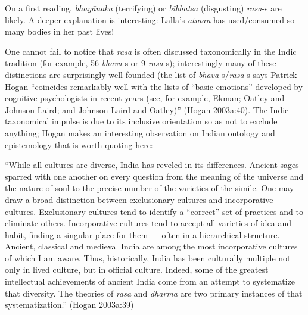 On a first reading, \textsl{bhayānaka} (terrifying) or \textsl{bībhatsa} (disgusting) \hbox{\textsl{rasa}-s} are likely. A deeper explanation is interesting: Lalla’s \textsl{ātman} has used/consumed so many bodies in her past lives!

One cannot fail to notice that \textsl{rasa} is often discussed taxonomically in the Indic tradition (for example, 56 \textsl{bhāva}-s or 9 \textsl{rasa}-s); interestingly many of these distinctions are surprisingly well founded (the list of \textsl{bhāva}-s/\textsl{rasa}-s says Patrick Hogan “coincides remarkably well with the lists of “basic emotions” developed by cognitive psychologists in recent years (see, for example, Ekman; Oatley and Johnson-Laird; and Johnson-Laird and Oatley)” (Hogan 2003a:40). The Indic taxonomical impulse is due to its inclusive orientation so as not to exclude anything; Hogan makes an interesting observation on Indian ontology and epistemology that is worth quoting here:

\begin{myquote}
“While all cultures are diverse, India has reveled in its differences. Ancient sages sparred with one another on every question from the meaning of the universe and the nature of soul to the precise number of the varieties of the simile. One may draw a broad distinction between exclusionary cultures and incorporative cultures. Exclusionary cultures tend to identify a “correct” set of practices and to eliminate others. Incorporative cultures tend to accept all varieties of idea and habit, finding a singular place for them — often in a hierarchical structure. Ancient, classical and medieval India are among the most incorporative cultures of which I am aware. Thus, historically, India has been culturally multiple not only in lived culture, but in official culture. Indeed, some of the greatest intellectual achievements of ancient India come from an attempt to systematize that diversity. The theories of \textsl{rasa} and \textsl{dharma} are two primary instances of that systematization.”  
\hfill(Hogan 2003a:39)
\end{myquote}

